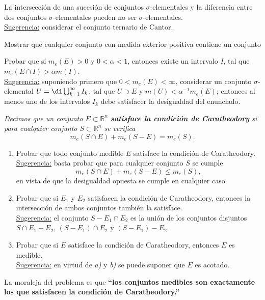 \documentclass{book}
\newcommand{\rr}{\mathbb{R}}
\begin{document}
  \begin{ejer}{} 
	La intersección de una sucesión de conjuntos $\sigma$-elementales y la diferencia 
  entre dos conjuntos $\sigma$-elementales pueden no ser $\sigma$-elementales.
 \\
  \underline{Sugerencia:} considerar el conjunto ternario de Cantor.
\end{ejer}


 \begin{ejer}{} 
	Mostrar que cualquier conjunto con medida exterior positiva contiene un conjunto 
	\end{ejer}
 
  \begin{ejer}{} 
	Probar que si $m_e(E)>0$ y $0<\alpha<1$, entonces existe un intervalo $I$, tal que
  $m_e(E\cap I)>\alpha m(I)$.
\\
  \underline{Sugerencia:} suponiendo primero que $0<m_e(E)<\infty$, considerar un conjunto
  $\sigma$-elemental $U=\di\bigcup_{k=1}^{\infty}I_k$, tal que 
  $U\supset E$ y $m(U)<\alpha^{-1} m_e(E)$; entonces al menos uno de los intervalos $I_k$
  debe satisfacer la desigualdad del enunciado.
 \end{ejer} 

  \begin{ejer} {} 
	{\it{Decimos que un conjunto $E\subset \rr^n$ 
  {\bf{satisface la condición de Caratheodory}}
  si para cualquier conjunto $S\subset \rr^n$ se verifica}} 
  $$m_e(S\cap E)+m_e(S-E)=m_e(S). $$
	\begin{enumerate}   
    \item Probar que todo conjunto medible $E$ satisface la condición de Caratheodory.
    \\
    \underline{Sugerencia:} basta probar que para cualquier conjunto $S$ se cumple
    $$m_e(S\cap E)+m_e(S-E)\leq m_e(S), $$
    en vista de que la desigualdad opuesta se cumple en cualquier caso.
 
    \item Probar que si $E_1$ y $E_2$ satisfacen la condición de Caratheodory, 
    entonces la intersección de ambos conjuntos también la satisface.
    \\
    \underline{Sugerencia:} el conjunto $S-E_1\cap E_2$ es la unión de los conjuntos 
    disjuntos $S\cap E_1-E_2$, $(S-E_1)\cap E_2$ y $(S-E_1)-E_2$.

    \item Probar que si $E$ satisface la condición de Caratheodory, entonces $E$ es medible.
    \\
    \underline{Sugerencia:} en virtud de {\it{a)}} y {\it{b)}} se puede suponer que $E$ es acotado.
	\end{enumerate}
    La moraleja del problema es que 
    {\bf{``los conjuntos medibles son exactamente los que satisfacen
    la condición de Caratheodory.''}}
  \end{ejer} 
	
\end{document}
